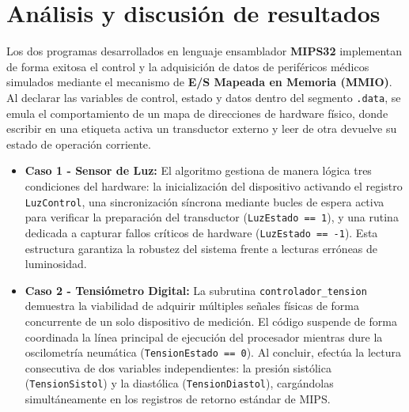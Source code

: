\documentclass{article}
\begin{document}
\section{Análisis y discusión de resultados}

Los dos programas desarrollados en lenguaje ensamblador \textbf{MIPS32} implementan de forma exitosa el control y la adquisición de datos de periféricos médicos simulados mediante el mecanismo de \textbf{E/S Mapeada en Memoria (MMIO)}. Al declarar las variables de control, estado y datos dentro del segmento \verb|.data|, se emula el comportamiento de un mapa de direcciones de hardware físico, donde escribir en una etiqueta activa un transductor externo y leer de otra devuelve su estado de operación corriente.

\begin{itemize}
    \item \textbf{Caso 1 - Sensor de Luz:} El algoritmo gestiona de manera lógica tres condiciones del hardware: la inicialización del dispositivo activando el registro \verb|LuzControl|, una sincronización síncrona mediante bucles de espera activa para verificar la preparación del transductor (\verb|LuzEstado == 1|), y una rutina dedicada a capturar fallos críticos de hardware (\verb|LuzEstado == -1|). Esta estructura garantiza la robustez del sistema frente a lecturas erróneas de luminosidad.
    \item \textbf{Caso 2 - Tensiómetro Digital:} La subrutina \verb|controlador_tension| demuestra la viabilidad de adquirir múltiples señales físicas de forma concurrente de un solo dispositivo de medición. El código suspende de forma coordinada la línea principal de ejecución del procesador mientras dure la oscilometría neumática (\verb|TensionEstado == 0|). Al concluir, efectúa la lectura consecutiva de dos variables independientes: la presión sistólica (\verb|TensionSistol|) y la diastólica (\verb|TensionDiastol|), cargándolas simultáneamente en los registros de retorno estándar de MIPS.
\end{itemize}


 
\end{document}
